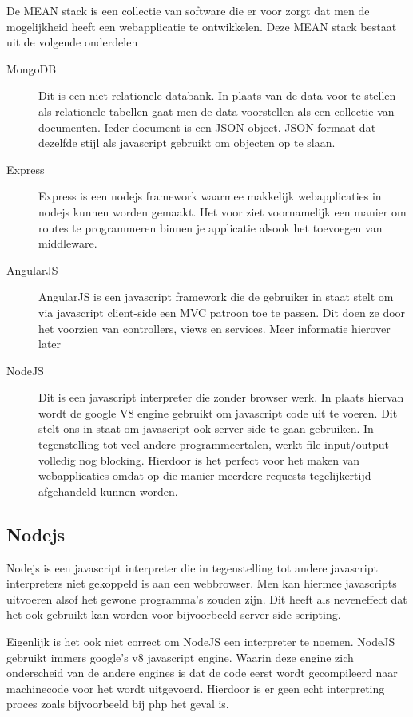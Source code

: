 \documentclass[a4paper,11pt]{article}
\begin{document}
De MEAN stack is een collectie van software die er voor zorgt dat men de mogelijkheid heeft een webapplicatie te ontwikkelen. Deze MEAN stack bestaat uit de volgende onderdelen

\begin{description}
\item[MongoDB] Dit is een niet-relationele databank. In plaats van de data voor te stellen als relationele tabellen gaat men de data voorstellen als een collectie van documenten. Ieder document is een JSON object. JSON formaat dat dezelfde stijl als javascript gebruikt om objecten op te slaan.
\item[Express] Express is een nodejs framework waarmee makkelijk webapplicaties in nodejs kunnen worden gemaakt. Het voor ziet voornamelijk een manier om routes te programmeren binnen je applicatie alsook het toevoegen van middleware.
\item[AngularJS] AngularJS is een javascript framework die de gebruiker in staat stelt om via javascript client-side een MVC patroon toe te passen. Dit doen ze door het voorzien van controllers, views en services. Meer informatie hierover later
\item[NodeJS] Dit is een javascript interpreter die zonder browser werk. In plaats hiervan wordt de google V8 engine gebruikt om javascript code uit te voeren. Dit stelt ons in staat om javascript ook server side te gaan gebruiken. In tegenstelling tot veel andere programmeertalen, werkt file input/output volledig nog blocking. Hierdoor is het perfect voor het maken van webapplicaties omdat op die manier meerdere requests tegelijkertijd afgehandeld kunnen worden.

\end{description}

\subsection{Nodejs}
Nodejs is een javascript interpreter die in tegenstelling tot andere javascript interpreters niet gekoppeld is aan een webbrowser. Men kan hiermee javascripts uitvoeren alsof het gewone programma's zouden zijn. Dit heeft als neveneffect dat het ook gebruikt kan worden voor bijvoorbeeld server side scripting.

Eigenlijk is het ook niet correct om NodeJS een interpreter te noemen. NodeJS gebruikt immers google's v8 javascript engine. Waarin deze engine zich onderscheid van de andere engines is dat de code eerst wordt gecompileerd naar machinecode voor het wordt uitgevoerd. Hierdoor is er geen echt interpreting proces zoals bijvoorbeeld bij php het geval is.
\end{document}
